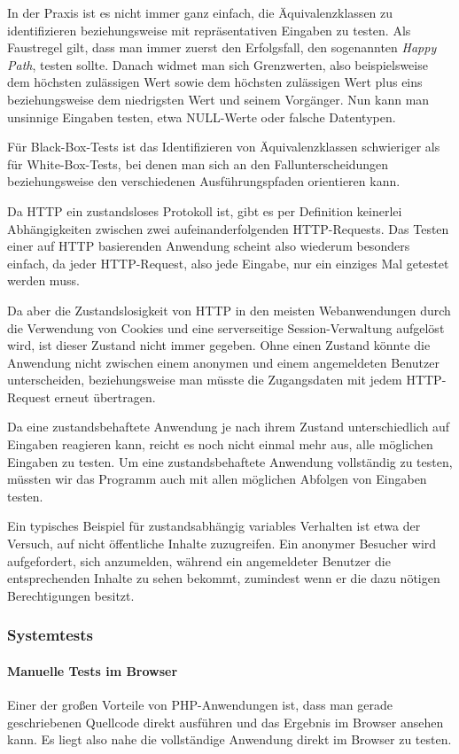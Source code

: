 In der Praxis ist es nicht immer ganz einfach, die Äquivalenzklassen zu identifizieren 
beziehungsweise mit repräsentativen Eingaben zu testen. Als Faustregel gilt, dass man immer
zuerst den Erfolgsfall, den sogenannten \textit{Happy Path}, testen sollte. Danach widmet man
sich Grenzwerten, also beispielsweise dem höchsten zulässigen Wert sowie dem höchsten
zulässigen Wert plus eins beziehungsweise dem niedrigsten Wert und seinem Vorgänger.
Nun kann man unsinnige Eingaben testen, etwa NULL-Werte oder falsche Datentypen.

Für Black-Box-Tests ist das Identifizieren von Äquivalenzklassen schwieriger als für White-Box-Tests,
bei denen man sich an den Fallunterscheidungen beziehungsweise den verschiedenen Ausführungspfaden orientieren kann.

Da HTTP ein zustandsloses Protokoll ist, gibt es per Definition keinerlei Abhängigkeiten
zwischen zwei aufeinanderfolgenden HTTP-Requests. Das Testen einer auf HTTP basierenden 
Anwendung scheint also wiederum besonders einfach, da jeder HTTP-Request, also jede Eingabe,
nur ein einziges Mal getestet werden muss.

Da aber die Zustandslosigkeit von HTTP in den meisten Webanwendungen durch die Verwendung von Cookies und eine serverseitige Session-Verwaltung aufgelöst wird, ist dieser Zustand nicht immer gegeben. 
Ohne einen Zustand könnte die Anwendung nicht zwischen einem anonymen und einem angemeldeten
Benutzer unterscheiden, beziehungsweise man müsste die Zugangsdaten mit jedem HTTP-Request erneut übertragen.

Da eine zustandsbehaftete Anwendung je nach ihrem Zustand unterschiedlich auf Eingaben reagieren kann,
reicht es noch nicht einmal mehr aus, alle möglichen Eingaben zu testen. Um eine zustandsbehaftete Anwendung vollständig zu testen, müssten wir das Programm auch mit allen möglichen Abfolgen von Eingaben testen.

Ein typisches Beispiel für zustandsabhängig variables Verhalten ist etwa der Versuch, auf
nicht öffentliche Inhalte zuzugreifen. Ein anonymer Besucher wird aufgefordert, sich anzumelden,
während ein angemeldeter Benutzer die entsprechenden Inhalte zu sehen bekommt, zumindest wenn er
die dazu nötigen Berechtigungen besitzt. 

\subsubsection{Systemtests}
\paragraph{Manuelle Tests im Browser} %
Einer der großen Vorteile von PHP-Anwendungen ist, dass man gerade geschriebenen Quellcode
direkt ausführen und das Ergebnis im Browser ansehen kann. Es liegt also nahe die vollständige Anwendung direkt im Browser zu testen.

